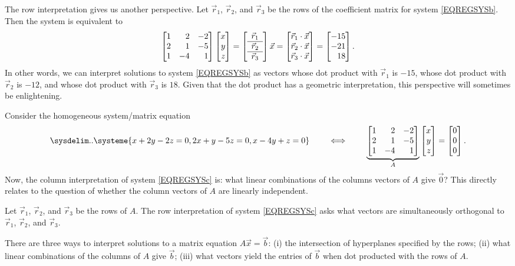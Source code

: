 The row interpretation gives us another perspective. Let $\vec r_1$, $\vec r_2$, and $\vec r_3$ be the rows of the coefficient matrix
for system \eqref{EQREGSYSb}. Then the system is equivalent to
\[
	\mat{1&2&-2\\2&1&-5\\1&-4&1}\mat{x\\y\\z}=
	\left[\begin{array}{c}\vec r_1\\\hline\vec r_2\\\hline\vec r_3\end{array}\right]\vec x=
	\mat{\vec r_1\cdot \vec x\\\vec r_2\cdot\vec x\\\vec r_3\cdot \vec x}
	     =\mat{-15\\-21\\18}.
\]
In other words, we can interpret solutions to system \eqref{EQREGSYSb} as vectors whose dot product
with $\vec r_1$ is $-15$, whose dot product with $\vec r_2$ is $-12$, and whose dot product with
$\vec r_3$ is $18$. Given that the dot product has a geometric interpretation, this perspective will
sometimes be enlightening.

Consider the homogeneous system/matrix equation
\begin{equation}
	\label{EQREGSYSc}
	\sysdelim..
		\systeme{
			x+2y-2z=0,
			2x+y-5z=0,
			x-4y+z=0
		}
		\qquad\iff\qquad
		\underbrace{\mat{1&2&-2\\2&1&-5\\1&-4&1}}_A\mat{x\\y\\z}=\mat{0\\0\\0}
		.
\end{equation}
Now, the column interpretation of system \eqref{EQREGSYSc} is: what linear combinations of the columns vectors
of $A$ give $\vec 0$? This directly relates to the question of whether the column vectors of $A$ are linearly independent.

Let $\vec r_1$, $\vec r_2$, and $\vec r_3$ be the rows of $A$. The row interpretation of system \eqref{EQREGSYSc} asks
what vectors are simultaneously orthogonal to $\vec r_1$, $\vec r_2$, and $\vec r_3$.

\begin{emphbox}[Takeaway]
	There are three ways to interpret solutions to a matrix equation $A\vec x=\vec b$: (i) the intersection of hyperplanes
	specified by the rows; (ii) what linear combinations of the columns of $A$ give $\vec b$; (iii) what vectors yield
	the entries of $\vec b$ when dot producted with the rows of $A$.
\end{emphbox}

